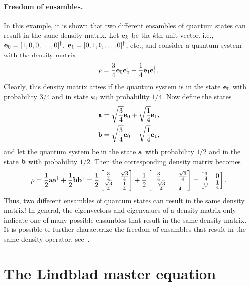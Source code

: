 \documentclass[11pt]{article}
\begin{document}
\paragraph{Freedom of ensambles.} In this example, it is shown that two different ensambles of
quantum states can result in the same density matrix. Let ${\mathbf e}_k$ be the $k$th unit vector, i.e.,
${\mathbf e}_0=[1,0,0,\ldots,0]^\dag$, ${\mathbf e}_1=[0,1,0,\ldots,0]^\dag$, etc., and consider a quantum system
with the density matrix
\[
\rho = \frac{3}{4}{\mathbf e}_0 {\mathbf e}_0^\dag + \frac{1}{4}{\mathbf e}_1 {\mathbf e}_1^\dag.
\]
Clearly,  this density matrix arises if the quantum system is in the state ${\mathbf e}_0$ with
probability $3/4$ and in state ${\mathbf e}_1$ with probability $1/4$. Now define the states
\begin{align}
  {\mathbf a} &= \sqrt{\frac{3}{4}} {\mathbf e}_0 +  \sqrt{\frac{1}{4}} {\mathbf e}_1, \\
  {\mathbf b} &= \sqrt{\frac{3}{4}} {\mathbf e}_0 -  \sqrt{\frac{1}{4}} {\mathbf e}_1,
\end{align}
and let the quantum system be in the state ${\mathbf a}$ with probability $1/2$ and in the state
${\mathbf b}$ with probability $1/2$. Then the corresponding density matrix becomes
\[
\rho = \frac{1}{2}\ab\ab^\dag + \frac{1}{2}\bb\bb^\dag =
%
\frac{1}{2}
\begin{bmatrix}
  \frac{3}{4} & \frac{\sqrt{3}}{4} \\
  \frac{\sqrt{3}}{4} & \frac{1}{4}
  \end{bmatrix} +
%
\frac{1}{2}\begin{bmatrix}
  \frac{3}{4} & -\frac{\sqrt{3}}{4} \\
  -\frac{\sqrt{3}}{4} & \frac{1}{4}
  \end{bmatrix} =
%
\begin{bmatrix}
  \frac{3}{4} & 0 \\
  0 & \frac{1}{4}
  \end{bmatrix}.
\]
Thus, two different ensambles of quantum states can result in the same density matrix! In general,
the eigenvectors and eigenvalues of a density matrix only indicate one of many possible ensambles
that result in the same density matrix. It is possible to further characterize the freedom of
ensambles that result in the same density operator, see~\cite{Nielsen-Chuang}.


\section{The Lindblad master equation}
\end{document}
